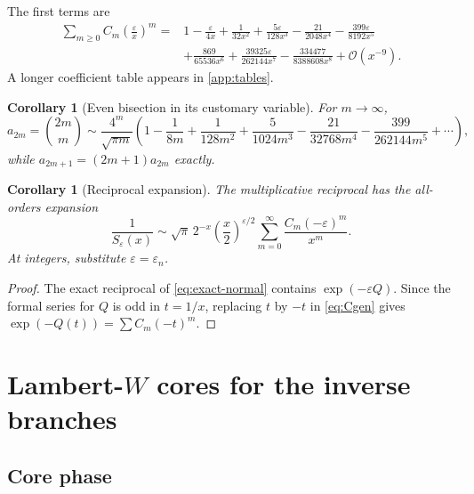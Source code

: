 \documentclass[11pt]{article}
\newtheorem{corollary}[theorem]{Corollary}
\theoremstyle{definition}
\theoremstyle{remark}
\newcommand{\eps}{\varepsilon}
\newcommand{\bigO}{\mathcal O}
\begin{document}
The first terms are
\begin{equation}\label{eq:forward-explicit}
\begin{split}
 \sum_{m\ge0}C_m\left(\frac\eps x\right)^m
 ={}&1-\frac{\eps}{4x}+\frac{1}{32x^2}
 +\frac{5\eps}{128x^3}-\frac{21}{2048x^4}
 -\frac{399\eps}{8192x^5}\\
 &+\frac{869}{65536x^6}
 +\frac{39325\eps}{262144x^7}
 -\frac{334477}{8388608x^8}
 +\bigO(x^{-9}).
\end{split}
\end{equation}
A longer coefficient table appears in \cref{app:tables}.

\begin{corollary}[Even bisection in its customary variable]\label{cor:central-binomial}
For $m\to\infty$,
\begin{equation}\label{eq:central-binomial-expansion}
 a_{2m}=\binom{2m}{m}
 \sim\frac{4^m}{\sqrt{\pi m}}
 \left(1-\frac1{8m}+\frac1{128m^2}+\frac5{1024m^3}
 -\frac{21}{32768m^4}-\frac{399}{262144m^5}+\cdots\right),
\end{equation}
while $a_{2m+1}=(2m+1)a_{2m}$ exactly.
\end{corollary}

\begin{corollary}[Reciprocal expansion]\label{cor:reciprocal}
The multiplicative reciprocal has the all-orders expansion
\begin{equation}\label{eq:reciprocal}
 \frac1{S_\eps(x)}\sim
 \sqrt\pi\,2^{-x}\left(\frac{x}{2}\right)^{\eps/2}
 \sum_{m=0}^\infty\frac{C_m(-\eps)^m}{x^m}.
\end{equation}
At integers, substitute $\eps=\eps_n$.
\end{corollary}

\begin{proof}
The exact reciprocal of \eqref{eq:exact-normal} contains $\exp(-\eps Q)$.  Since the formal series for $Q$ is odd in $t=1/x$, replacing $t$ by $-t$ in \eqref{eq:Cgen} gives $\exp(-Q(t))=\sum C_m(-t)^m$.
\end{proof}

\section{Lambert-\texorpdfstring{$W$}{W} cores for the inverse branches}

\subsection{Core phase}
\end{document}
